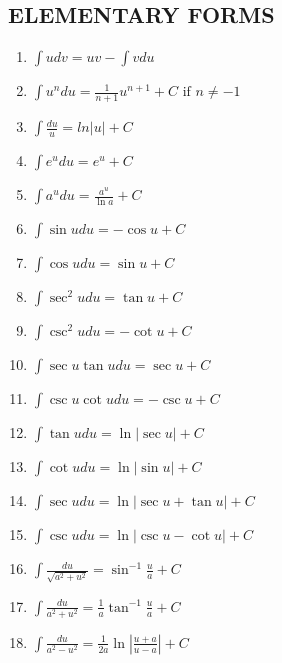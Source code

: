 \documentclass[10pt, letterpaper]{article}
\begin{document}
\subsection{ELEMENTARY FORMS}
\begin{enumerate}
	\item $\int \limits u dv = u v - \int \limits v du$
	\item $\int \limits u^n du = \frac{1}{n+1} u^{n+1} + C \text{ if } n \neq -1$
	\item $\int \limits \frac{du}{u} = ln|u| + C$
	\item $\int \limits e^u du = e^u + C$
	\item $\int \limits a^u du = \frac{a^u}{\ln a} + C$
	\item $\int \limits \sin u du = -\cos u + C$
	\item $\int \limits \cos u du = \sin u + C$
	\item $\int \limits \sec ^2 u du = \tan u + C$
	\item $\int \limits \csc ^2 u du = -\cot u + C$
	\item $\int \limits \sec u \tan u du = \sec u + C$
	\item $\int \limits \csc u \cot u du = -\csc u + C$
	\item $\int \limits \tan u du = \ln | \sec u | + C$
	\item $\int \limits \cot u du = \ln | \sin u | + C$
	\item $\int \limits \sec u du = \ln | \sec u + \tan u | + C$
	\item $\int \limits \csc u du = \ln | \csc u - \cot u | + C$
	\item $\int \limits \frac{du}{\sqrt{a^2 + u^2}} = \sin^{-1} \frac{u}{a} + C$
	\item $\int \limits \frac{du}{a^2 + u^2} = \frac{1}{a} \tan^{-1} \frac{u}{a} + C$
	\item $\int \limits \frac{du}{a^2 - u^2} = \frac{1}{2a} \ln | \frac{u + a}{u - a} | + C$
\end{enumerate}
\end{document}
